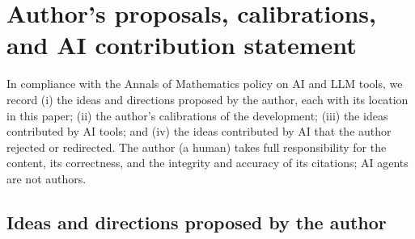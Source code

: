 \documentclass{article}
\begin{document}
\section*{Author's proposals, calibrations, and AI contribution statement}
In compliance with the Annals of Mathematics policy on AI and LLM tools, we
record (i) the ideas and directions proposed by the author, each with its
location in this paper; (ii) the author's calibrations of the development;
(iii) the ideas contributed by AI tools; and (iv) the ideas contributed by
AI that the author rejected or redirected. The author (a human) takes full
responsibility for the content, its correctness, and the integrity and
accuracy of its citations; AI agents are not authors.

\subsection*{Ideas and directions proposed by the author}
\end{document}
